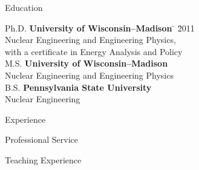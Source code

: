 \documentclass{resume2} %
\begin{document}

\begin{rSection}{Education}

\begin{tabbing}
Ph.D. \hspace*{2 em}\= \textbf{University of Wisconsin--Madison} \hspace*{5em} \= \hspace*{15em} \= 2011 \\
      \> Nuclear Engineering and Engineering Physics, \\ \>with a certificate in Energy Analysis and Policy \\
%
M.S. \hspace*{2 em}\> \textbf{University of Wisconsin--Madison} \>  \\
      \> Nuclear Engineering and Engineering Physics \\
%
B.S. \hspace*{2 em}\> \textbf{Pennsylvania State University} \>  \\
      \> Nuclear Engineering
\end{tabbing}
\end{rSection}

\begin{rSection}{Experience}

\end{rSection}

\vspace*{1 em}
\begin{rSection}{Professional Service}

\end{rSection}

\begin{rSection}{Teaching Experience}

\end{rSection}
\end{document}
